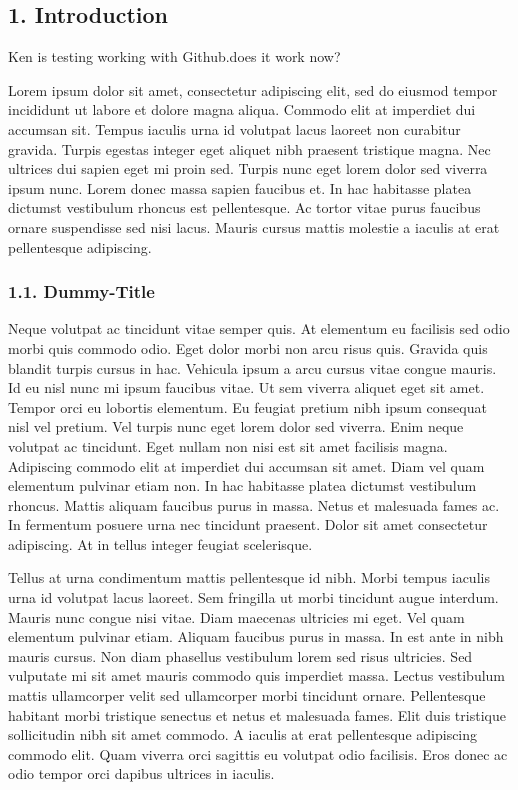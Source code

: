 \documentclass[
]{article}
\begin{document}
\newpage


\hypertarget{introduction}{%
\subsection{1. Introduction}\label{introduction}}

Ken is testing working with Github.does it work now?

Lorem ipsum dolor sit amet, consectetur adipiscing elit, sed do eiusmod
tempor incididunt ut labore et dolore magna aliqua. Commodo elit at
imperdiet dui accumsan sit. Tempus iaculis urna id volutpat lacus
laoreet non curabitur gravida. Turpis egestas integer eget aliquet nibh
praesent tristique magna. Nec ultrices dui sapien eget mi proin sed.
Turpis nunc eget lorem dolor sed viverra ipsum nunc. Lorem donec massa
sapien faucibus et. In hac habitasse platea dictumst vestibulum rhoncus
est pellentesque. Ac tortor vitae purus faucibus ornare suspendisse sed
nisi lacus. Mauris cursus mattis molestie a iaculis at erat pellentesque
adipiscing.

\hypertarget{dummy-title}{%
\subsubsection{1.1. Dummy-Title}\label{dummy-title}}

Neque volutpat ac tincidunt vitae semper quis. At elementum eu facilisis
sed odio morbi quis commodo odio. Eget dolor morbi non arcu risus quis.
Gravida quis blandit turpis cursus in hac. Vehicula ipsum a arcu cursus
vitae congue mauris. Id eu nisl nunc mi ipsum faucibus vitae. Ut sem
viverra aliquet eget sit amet. Tempor orci eu lobortis elementum. Eu
feugiat pretium nibh ipsum consequat nisl vel pretium. Vel turpis nunc
eget lorem dolor sed viverra. Enim neque volutpat ac tincidunt. Eget
nullam non nisi est sit amet facilisis magna. Adipiscing commodo elit at
imperdiet dui accumsan sit amet. Diam vel quam elementum pulvinar etiam
non. In hac habitasse platea dictumst vestibulum rhoncus. Mattis aliquam
faucibus purus in massa. Netus et malesuada fames ac. In fermentum
posuere urna nec tincidunt praesent. Dolor sit amet consectetur
adipiscing. At in tellus integer feugiat scelerisque.

Tellus at urna condimentum mattis pellentesque id nibh. Morbi tempus
iaculis urna id volutpat lacus laoreet. Sem fringilla ut morbi tincidunt
augue interdum. Mauris nunc congue nisi vitae. Diam maecenas ultricies
mi eget. Vel quam elementum pulvinar etiam. Aliquam faucibus purus in
massa. In est ante in nibh mauris cursus. Non diam phasellus vestibulum
lorem sed risus ultricies. Sed vulputate mi sit amet mauris commodo quis
imperdiet massa. Lectus vestibulum mattis ullamcorper velit sed
ullamcorper morbi tincidunt ornare. Pellentesque habitant morbi
tristique senectus et netus et malesuada fames. Elit duis tristique
sollicitudin nibh sit amet commodo. A iaculis at erat pellentesque
adipiscing commodo elit. Quam viverra orci sagittis eu volutpat odio
facilisis. Eros donec ac odio tempor orci dapibus ultrices in iaculis.
\end{document}
